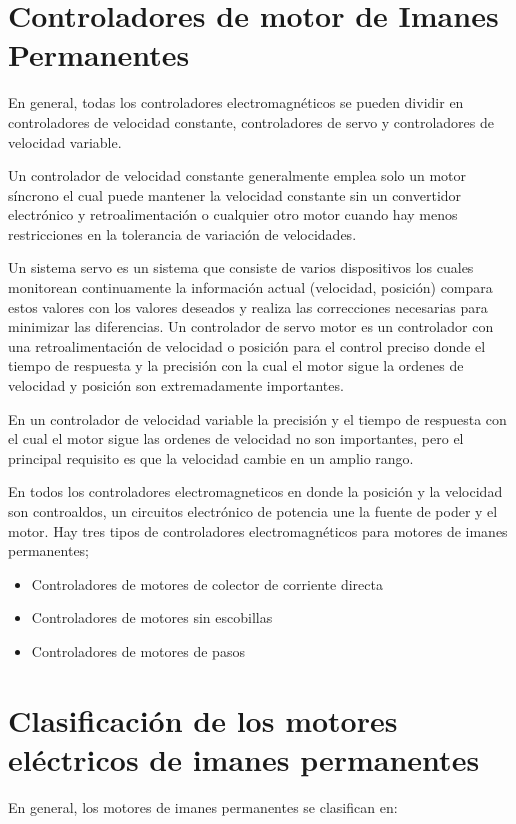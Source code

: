 \documentclass[12pt]{book}
\theoremstyle{definition}
\theoremstyle{remark}
\theoremstyle{plain}
\begin{document}
\section{Controladores de motor de Imanes Permanentes }

En general, todas los controladores electromagnéticos se pueden dividir en controladores de velocidad constante,  controladores de servo y controladores de velocidad variable.

Un controlador de velocidad constante generalmente emplea solo un motor síncrono el cual puede mantener la velocidad constante sin un convertidor electrónico y retroalimentación o cualquier otro motor cuando hay menos restricciones en la tolerancia de variación de velocidades.

Un sistema servo es un sistema que consiste de varios dispositivos los cuales monitorean continuamente la información actual (velocidad, posición) compara estos valores con los valores deseados y realiza las correcciones necesarias para minimizar las diferencias. Un controlador de servo motor es un controlador con una retroalimentación de velocidad o posición para el control preciso donde el tiempo de respuesta y la precisión con la cual el motor sigue la ordenes de velocidad y posición son extremadamente importantes.

 En un controlador de velocidad variable la precisión y el tiempo de respuesta con el cual el motor sigue las ordenes de velocidad no son importantes, pero el principal requisito es que la velocidad cambie en un amplio rango.

En todos los controladores electromagneticos en donde la posición y la velocidad son controaldos, un circuitos electrónico de potencia une la fuente de poder y el motor. Hay tres tipos de controladores electromagnéticos para motores de imanes permanentes;

\begin{itemize}
\item Controladores de motores de colector  de corriente directa
\item Controladores de motores sin escobillas
\item Controladores de motores de pasos
\end{itemize}

\section{Clasificación de los motores eléctricos de imanes permanentes}
En general, los motores de imanes permanentes se clasifican en:
\end{document}
